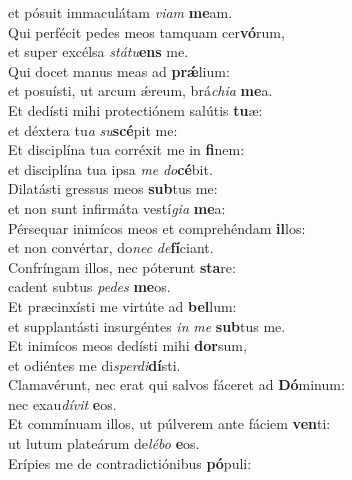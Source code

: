 \oddverse et pósuit immaculátam \textit{vi}\textit{am} \textbf{me}am.\\
\evenverse Qui perfécit pedes meos tamquam cer\textbf{vó}rum,~\*\\
\evenverse et super excélsa \textit{stá}\textit{tu}\textbf{ens} me.\\
\oddverse Qui docet manus meas ad \textbf{prǽ}lium:~\*\\
\oddverse et posuísti, ut arcum ǽreum, brá\textit{chi}\textit{a} \textbf{me}a.\\
\evenverse Et dedísti mihi protectiónem salútis \textbf{tu}æ:~\*\\
\evenverse et déxtera tu\textit{a} \textit{su}\textbf{scé}pit me:\\
\oddverse Et disciplína tua corréxit me in \textbf{fi}nem:~\*\\
\oddverse et disciplína tua ipsa \textit{me} \textit{do}\textbf{cé}bit.\\
\evenverse Dilatásti gressus meos \textbf{sub}tus me:~\*\\
\evenverse et non sunt infirmáta vestí\textit{gi}\textit{a} \textbf{me}a:\\
\oddverse Pérsequar inimícos meos et comprehéndam \textbf{il}los:~\*\\
\oddverse et non convértar, do\textit{nec} \textit{de}\textbf{fí}ciant.\\
\evenverse Confríngam illos, nec póterunt \textbf{sta}re:~\*\\
\evenverse cadent subtus \textit{pe}\textit{des} \textbf{me}os.\\
\oddverse Et præcinxísti me virtúte ad \textbf{bel}lum:~\*\\
\oddverse et supplantásti insurgéntes \textit{in} \textit{me} \textbf{sub}tus me.\\
\evenverse Et inimícos meos dedísti mihi \textbf{dor}sum,~\*\\
\evenverse et odiéntes me di\textit{sper}\textit{di}\textbf{dí}sti.\\
\oddverse Clamavérunt, nec erat qui salvos fáceret ad \textbf{Dó}minum:~\*\\
\oddverse nec exau\textit{dí}\textit{vit} \textbf{e}os.\\
\evenverse Et commínuam illos, ut púlverem ante fáciem \textbf{ven}ti:~\*\\
\evenverse ut lutum plateárum de\textit{lé}\textit{bo} \textbf{e}os.\\
\oddverse Erípies me de contradictiónibus \textbf{pó}puli:~\*\\

